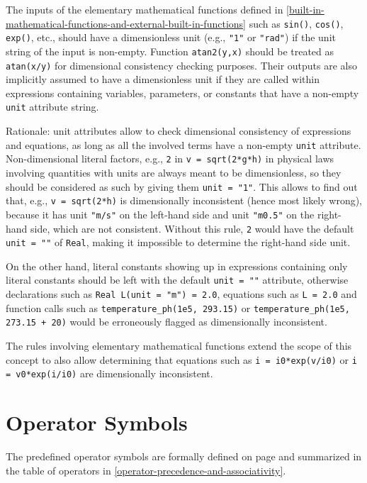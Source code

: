 The inputs of the elementary mathematical functions defined in \cref{built-in-mathematical-functions-and-external-built-in-functions} such as \lstinline!sin()!, \lstinline!cos()!, \lstinline!exp()!, etc., should have a dimensionless unit (e.g., \lstinline!"1"! or \lstinline!"rad"!) if the unit string of the input is non-empty. Function \lstinline!atan2(y,x)! should be treated as  \lstinline!atan(x/y)! for dimensional consistency checking purposes.
Their outputs are also implicitly assumed to have a dimensionless unit if they are called within expressions containing variables, parameters, or constants that have a non-empty \lstinline!unit! attribute string.

\begin{nonnormative}
Rationale: unit attributes allow to check dimensional consistency of expressions and equations, as long as all the involved terms have a non-empty \lstinline!unit! attribute.
Non-dimensional literal factors, e.g., \lstinline!2! in \lstinline!v = sqrt(2*g*h)! in physical laws involving quantities with units are always meant to be dimensionless, so they should be considered as such by giving them \lstinline!unit = "1"!.
This allows to find out that, e.g., \lstinline!v = sqrt(2*h)! is dimensionally inconsistent (hence most likely wrong), because it has unit \lstinline!"m/s"! on the left-hand side and unit \lstinline!"m0.5"! on the right-hand side, which are not consistent.
Without this rule, \lstinline!2! would have the default \lstinline!unit = ""! of \lstinline!Real!, making it impossible to determine the right-hand side unit.

On the other hand, literal constants showing up in expressions containing only literal constants should be left with the default \lstinline!unit = ""! attribute, otherwise declarations such as \lstinline!Real L(unit = "m") = 2.0!, equations such as \lstinline!L = 2.0! and function calls such as \lstinline!temperature_ph(1e5, 293.15)! or \lstinline!temperature_ph(1e5, 273.15 + 20)! would be erroneously flagged as dimensionally inconsistent.

The rules involving elementary mathematical functions extend the scope of this concept to also allow determining that equations such as \lstinline!i = i0*exp(v/i0)! or \lstinline!i = v0*exp(i/i0)! are dimensionally inconsistent.
\end{nonnormative}

\section{Operator Symbols}\label{operator-symbols}

The predefined operator symbols are formally defined on page \pageref{lexical-conventions} and
summarized in the table of operators in \cref{operator-precedence-and-associativity}.
